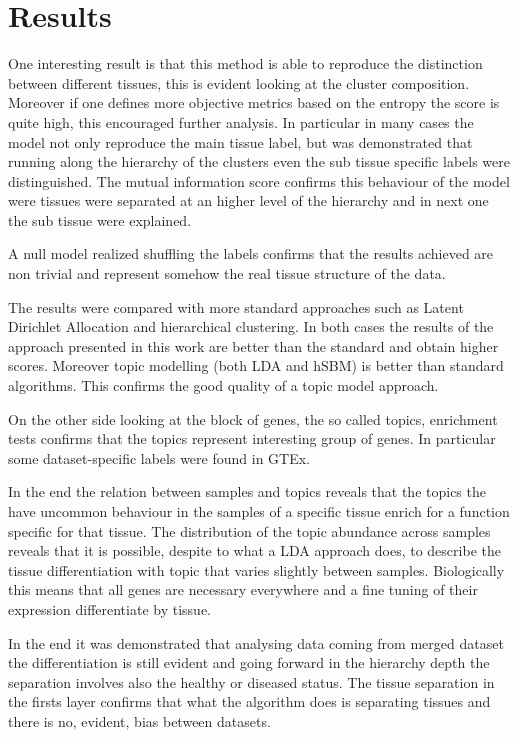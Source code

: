 \section{Results}\label{sec:topic/results}

One interesting result is that this method is able to reproduce the distinction between different tissues, this is evident looking at the cluster composition. Moreover if one defines more objective metrics based on the entropy the score is quite high, this encouraged further analysis.
In particular in many cases the model not only reproduce the main tissue label, but was demonstrated that running along the hierarchy of the clusters even the sub tissue specific labels were distinguished. The mutual information score confirms this behaviour of the model were tissues were separated at an higher level of the hierarchy and in next one the sub tissue were explained.

A null model realized shuffling the labels confirms that the results achieved are non trivial and represent somehow the real tissue structure of the data.

The results were compared with more standard approaches such as Latent Dirichlet Allocation and hierarchical clustering. In both cases the results of the approach presented in this work are better than the standard and obtain higher scores. Moreover topic modelling (both LDA and hSBM) is better than standard algorithms. This confirms the good quality of a topic model approach.

On the other side looking at the block of genes, the so called topics, enrichment tests confirms that the topics represent interesting group of genes. In particular some dataset-specific labels were found in GTEx.

In the end the relation between samples and topics reveals that the topics the have uncommon behaviour in the samples of a specific tissue enrich for a function specific for that tissue. The distribution of the topic abundance across samples reveals that it is possible, despite to what a LDA approach does, to describe the tissue differentiation with topic that varies slightly between samples. Biologically this means that all genes are necessary everywhere and a fine tuning of their expression differentiate by tissue.

In the end it was demonstrated that analysing data coming from merged dataset the differentiation is still evident and going forward in the hierarchy depth the separation involves also the healthy or diseased status. The tissue separation in the firsts layer confirms that what the algorithm does is separating tissues and there is no, evident, bias between datasets.